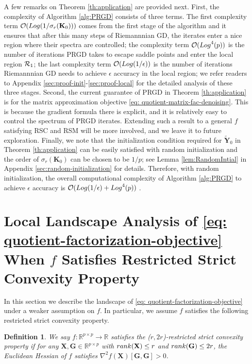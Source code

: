 \documentclass[11pt]{article}
\newtheorem{Definition}{Definition}
\newcommand{\bbR}{\mathbb{R}}
\newcommand{\0}{{\mathbf{0}}}
\newcommand{\1}{{\mathbf{1}}}
\newcommand{\X}{{\mathbf{X}}}
\newcommand{\K}{{\mathbf{K}}}
\newcommand{\Y}{{\mathbf{Y}}}
\newcommand{\G}{{\mathbf{G}}}
\newcommand{\cR}{{\cal R}}
\newcommand{\rank}{{\rm rank}}
\renewcommand{\log}{{\rm Log}}
\newcommand{\nc}{\normalcolor}
\begin{document}
{A few remarks on Theorem \ref{th:application} are provided next. First, the complexity of Algorithm \ref{alg:PRGD} consists of three terms. The first complexity term $\mathcal{O}(\log(1/\sigma_r(\K_0)))$ comes from the first stage of the algorithm and it ensures that after this many steps of Riemannnian GD, the iterates enter a nice region where their spectra are controlled; the complexity term $ \mathcal{O}(\log^4(p))$ is the number of iterations PRGD takes to escape saddle points and enter the local region $\cR_1$; the last complexity term $\mathcal{O}(\log(1/\epsilon))$ is the number of iterations Riemannnian GD needs to achieve $\epsilon$ accuracy in the local region; we refer readers to Appendix \ref{sec:proof-init}-\ref{sec:proof-local} for the detailed analysis of these three stages. Second, the current guarantee of PRGD in Theorem \ref{th:application} is for the matrix approximation objective \eqref{eq: quotient-matrix-fac-denoising}. This is because the gradient formula there is explicit, and it is relatively easy to control the spectrum of PRGD iterates. Extending such a result to a general $f$ satisfying RSC and RSM will be more involved, and we leave it to future exploration. Finally, we note that the initialization condition required for $\widetilde{\Y}_0$ in Theorem \ref{th:application} can be easily satisfied with random initialization and the order of $\sigma_r(\K_0)$ can be chosen to be $1/p$; see Lemma \ref{lem:RandomIntial} in Appendix \ref{sec:random-initialization} for details. Therefore, with random initialization, the overall computational complexity of Algorithm \ref{alg:PRGD} to achieve $\epsilon$ accuracy is $\mathcal{O}(\log(1/\epsilon) + \log^4(p))$ .
}



\section{Local Landscape Analysis of \eqref{eq: quotient-factorization-objective} When $f$ Satisfies Restricted Strict Convexity Property} \label{sec: landscape-convex-f}
In this section we describe the landscape of \eqref{eq: quotient-factorization-objective} under a weaker assumption on $f$. In particular, we assume $f$ satisfies the following restricted strict convexity property. 
\begin{Definition} \label{def: restricted-strictly-convex} We say $f : \bbR^{p \times p} \to \bbR$ satisfies the ($r,2r$)-restricted strict convexity property if for any $\X, \G \in \bbR^{p \times p}$ with $\rank(\X) \leq r$ and $\rank(\G) \leq 2r$, the Euclidean Hessian of $f$ satisfies $ \nabla^2 f(\X)[\G, \G] > 0$. \nc
\end{Definition}
\end{document}
